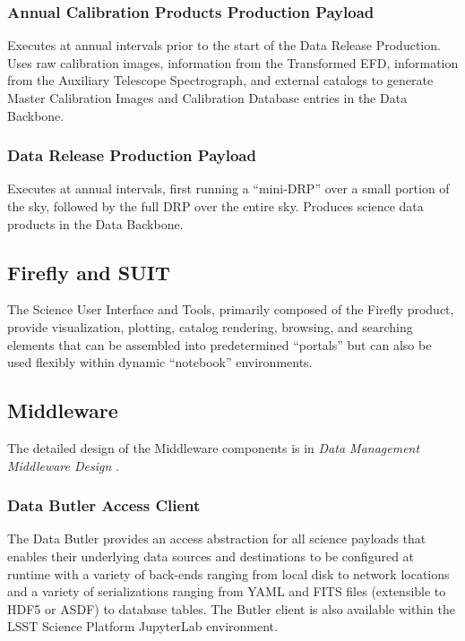 \documentclass[DM,toc,lsstdraft]{lsstdoc}
\begin{document}
\subsubsection{Annual Calibration Products Production
Payload}\label{annual-calibration-products-production-payload}

Executes at annual intervals prior to the start of the Data Release Production. Uses
raw calibration images, information from the Transformed EFD,
information from the Auxiliary Telescope Spectrograph, and external
catalogs to generate Master Calibration Images and Calibration Database
entries in the Data Backbone.

\subsubsection{Data Release Production
Payload}\label{data-release-production-payload}

Executes at annual intervals,
first running a ``mini-DRP'' over a small portion of the sky, followed
by the full DRP over the entire sky. Produces science data products in
the Data Backbone.

\subsection{Firefly and SUIT}\label{suit}

The Science User Interface and Tools, primarily composed of the Firefly product, provide visualization, plotting,
catalog rendering, browsing, and searching elements that can be
assembled into predetermined ``portals'' but can also be used flexibly
within dynamic ``notebook'' environments.

\subsection{Middleware}\label{middleware}

The detailed design of the Middleware components is in \textit{Data Management Middleware Design} .

\subsubsection{Data Butler Access
Client}\label{data-butler-access-client}

The Data Butler provides an access abstraction for all science payloads
that enables their underlying data sources and destinations to be
configured at runtime with a variety of back-ends ranging from local
disk to network locations and a variety of serializations ranging from
YAML and FITS files (extensible to HDF5 or ASDF) to database tables. The
Butler client is also available within the LSST Science Platform
JupyterLab environment.
\end{document}
